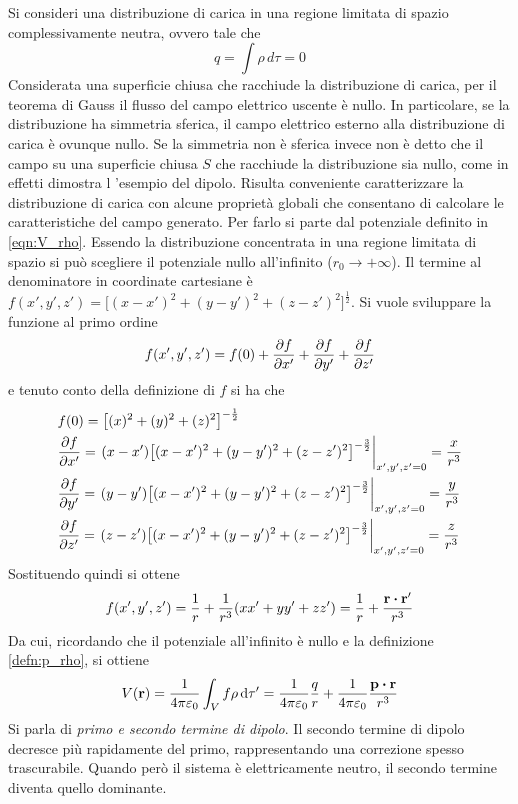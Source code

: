 Si consideri una distribuzione di carica in una regione limitata di spazio complessivamente neutra, ovvero tale che
\[
    q=\int\rho\,d\tau=0
\]
Considerata una superficie chiusa che racchiude la distribuzione di carica, per il teorema di Gauss il flusso del campo elettrico
uscente è nullo. In particolare, se la distribuzione ha simmetria sferica, il campo elettrico esterno alla distribuzione di carica
è ovunque nullo. Se la simmetria non è sferica invece non è detto che il campo su una superficie chiusa $S$ che racchiude la
distribuzione sia nullo, come in effetti dimostra l 'esempio del dipolo.
Risulta conveniente caratterizzare la distribuzione di carica con alcune proprietà globali che consentano di calcolare le caratteristiche
del campo generato. Per farlo si parte dal potenziale definito in \ref{eqn:V_rho}. Essendo la distribuzione concentrata in una
regione limitata di spazio si può scegliere il potenziale nullo all'infinito ($r_0\rightarrow +\infty$). Il termine al denominatore
in coordinate cartesiane è
$f(x',y',z')=\bigl[(x-x')^2+(y-y')^2+(z-z')^2\bigr]^{\frac{1}{2}}$. Si vuole sviluppare la funzione al primo ordine
\[
    f(x',y',z')=f(0)+\pdv{f}{x'}(0)+\pdv{f}{y'}(0)+\pdv{f}{z'}(0)
\]
e tenuto conto della definizione di $f$ si ha che
\[
    \begin{split}
        & f(0)=\bigl[(x)^2+(y)^2+(z)^2\bigr]^{-\frac{1}{2}} \\
        & \pdv{f}{x'}(0)=\eval{(x-x')\bigl[(x-x')^2+(y-y')^2+(z-z')^2\bigr]^{-\frac{3}{2}}}_{x',y',z'=0}=\frac{x}{r^3} \\
        & \pdv{f}{y'}(0)=\eval{(y-y')\bigl[(x-x')^2+(y-y')^2+(z-z')^2\bigr]^{-\frac{3}{2}}}_{x',y',z'=0}=\frac{y}{r^3} \\
        & \pdv{f}{z'}(0)=\eval{(z-z')\bigl[(x-x')^2+(y-y')^2+(z-z')^2\bigr]^{-\frac{3}{2}}}_{x',y',z'=0}=\frac{z}{r^3}
    \end{split}
\]
Sostituendo quindi si ottene
\[
    f(x',y',z')=\frac{1}{r}+\frac{1}{r^3}(xx'+yy'+zz')=\frac{1}{r}+\frac{\vb{r}\vdot\vb{r'}}{r^3}
\]
Da cui, ricordando che il potenziale all'infinito è nullo e la definizione \ref{defn:p_rho}, si ottiene
\begin{equation}
    V(\vb{r})=\rec{4\pi\epsilon_0}\int_{V}f\rho \dd{\tau'} =\frac{1}{4\pi\epsilon_0}\frac{q}{r}+\frac{1}{4\pi\epsilon_0}\frac{\vb{p}\vdot\vb{r}}{r^3}
\end{equation}
Si parla di \textit{primo e secondo termine di dipolo}. Il secondo termine di dipolo decresce più rapidamente del primo,
rappresentando una correzione spesso trascurabile. Quando però il sistema è elettricamente neutro, il secondo termine diventa quello
dominante.
